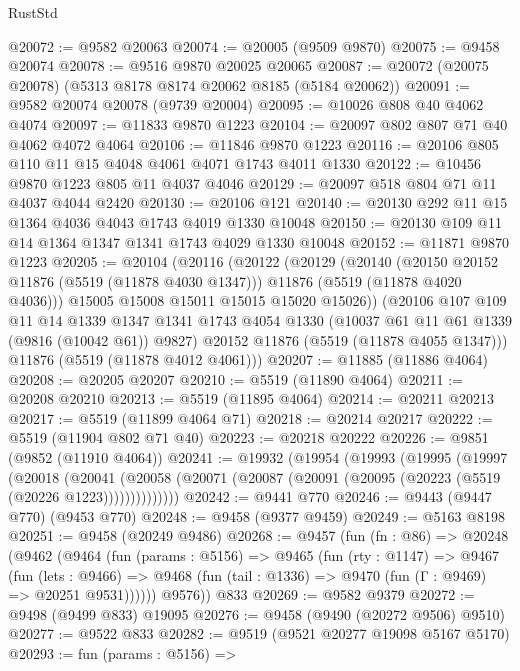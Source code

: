 \begin{lexlean}{RustStd}
\begin{coremodule}
@20072 := @9582 @20063
@20074 := @20005 (@9509 @9870)
@20075 := @9458 @20074
@20078 := @9516 @9870 @20025 @20065
@20087 := @20072 (@20075 @20078) (@5313 @8178 @8174 @20062 @8185 (@5184 @20062))
@20091 := @9582 @20074 @20078 (@9739 @20004)
@20095 := @10026 @808 @40 @4062 @4074
@20097 := @11833 @9870 @1223
@20104 := @20097 @802 @807 @71 @40 @4062 @4072 @4064
@20106 := @11846 @9870 @1223
@20116 := @20106 @805 @110 @11 @15 @4048 @4061 @4071 @1743 @4011 @1330
@20122 := @10456 @9870 @1223 @805 @11 @4037 @4046
@20129 := @20097 @518 @804 @71 @11 @4037 @4044 @2420
@20130 := @20106 @121
@20140 := @20130 @292 @11 @15 @1364 @4036 @4043 @1743 @4019 @1330 @10048
@20150 := @20130 @109 @11 @14 @1364 @1347 @1341 @1743 @4029 @1330 @10048
@20152 := @11871 @9870 @1223
@20205 := @20104
    (@20116
      (@20122
        (@20129
          (@20140
            (@20150 @20152 @11876 (@5519 (@11878 @4030 @1347)))
            @11876
            (@5519 (@11878 @4020 @4036)))
          @15005
          @15008
          @15011
          @15015
          @15020
          @15026))
      (@20106
        @107
        @109
        @11
        @14
        @1339
        @1347
        @1341
        @1743
        @4054
        @1330
        (@10037 @61 @11 @61 @1339 (@9816 (@10042 @61)) @9827)
        @20152
        @11876
        (@5519 (@11878 @4055 @1347)))
      @11876
      (@5519 (@11878 @4012 @4061)))
@20207 := @11885 (@11886 @4064)
@20208 := @20205 @20207
@20210 := @5519 (@11890 @4064)
@20211 := @20208 @20210
@20213 := @5519 (@11895 @4064)
@20214 := @20211 @20213
@20217 := @5519 (@11899 @4064 @71)
@20218 := @20214 @20217
@20222 := @5519 (@11904 @802 @71 @40)
@20223 := @20218 @20222
@20226 := @9851 (@9852 (@11910 @4064))
@20241 := @19932
    (@19954
      (@19993
        (@19995
          (@19997
            (@20018
              (@20041
                (@20058 (@20071 (@20087 (@20091 (@20095 (@20223 (@5519 (@20226 @1223))))))))))))))
@20242 := @9441 @770
@20246 := @9443 (@9447 @770) (@9453 @770)
@20248 := @9458 (@9377 @9459)
@20249 := @5163 @8198
@20251 := @9458 (@20249 @9486)
@20268 := @9457
    (fun (fn : @86) =>
    @20248
      (@9462
        (@9464
          (fun (params : @5156) =>
          @9465
            (fun (rty : @1147) =>
            @9467
              (fun (lets : @9466) =>
              @9468 (fun (tail : @1336) => @9470 (fun (Γ : @9469) => @20251 @9531))))))
        @9576))
    @833
@20269 := @9582 @9379
@20272 := @9498 (@9499 @833) @19095
@20276 := @9458 (@9490 (@20272 @9506) @9510)
@20277 := @9522 @833
@20282 := @9519 (@9521 @20277 @19098 @5167 @5170)
@20293 := fun (params : @5156) =>

\end{coremodule}
\end{lexlean}

